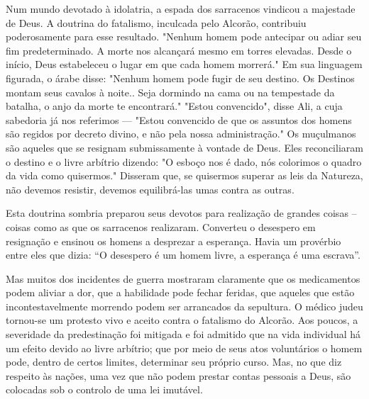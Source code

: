 \documentclass[11pt,a5paper,twoside,openany]{book}
\begin{document}
Num mundo devotado à idolatria, a espada dos sarracenos vindicou a majestade de Deus. A doutrina do fatalismo, inculcada pelo Alcorão, contribuiu poderosamente para esse resultado. "Nenhum homem pode antecipar ou adiar seu fim predeterminado. A morte nos alcançará mesmo em torres elevadas. Desde o início, Deus estabeleceu o lugar em que cada homem morrerá." Em sua linguagem figurada, o árabe disse: "Nenhum homem pode fugir de seu destino. Os Destinos montam seus cavalos à noite.. Seja dormindo na cama ou na tempestade da batalha, o anjo da morte te encontrará." "Estou convencido", disse Ali, a cuja sabedoria já nos referimos — "Estou convencido de que os assuntos dos homens são regidos por decreto divino, e não pela nossa administração." Os muçulmanos são aqueles que se resignam submissamente à vontade de Deus. Eles reconciliaram o destino e o livre arbítrio dizendo: "O esboço nos é dado, nós colorimos o quadro da vida como quisermos." Disseram que, se quisermos superar as leis da Natureza, não devemos resistir, devemos equilibrá-las umas contra as outras.

Esta doutrina sombria preparou seus devotos para realização de grandes coisas – coisas como as que os sarracenos realizaram. Converteu o desespero em resignação e ensinou os homens a desprezar a esperança. Havia um provérbio entre eles que dizia: “O desespero é um homem livre, a esperança é uma escrava”.

Mas muitos dos incidentes de guerra mostraram claramente que os medicamentos podem aliviar a dor, que a habilidade pode fechar feridas, que aqueles que estão incontestavelmente morrendo podem ser arrancados da sepultura. O médico judeu tornou-se um protesto vivo e aceito contra o fatalismo do Alcorão. Aos poucos, a severidade da predestinação foi mitigada e foi admitido que na vida individual há um efeito devido ao livre arbítrio; que por meio de seus atos voluntários o homem pode, dentro de certos limites, determinar seu próprio curso. Mas, no que diz respeito às nações, uma vez que não podem prestar contas pessoais a Deus, são colocadas sob o controlo de uma lei imutável.
\end{document}
